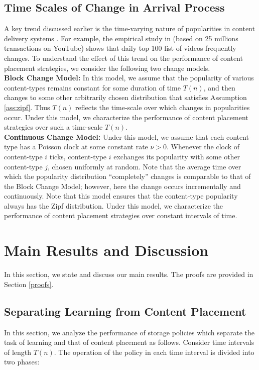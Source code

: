 \documentclass[10pt, conference, letterpaper]{IEEEtran}
\begin{document}
\subsection{Time Scales of Change in Arrival Process}
\label{subsec:change_model}
A key trend discussed earlier is the time-varying nature of
popularities in content delivery systems \cite{Gill07,temporal13}. For
example, the empirical study in \cite{Gill07} (based on 25 millions
transactions on YouTube) shows that daily top 100 list of videos
frequently changes.
To understand the effect of this trend on the performance of content
placement strategies, we consider the following two change models.\\

\noindent \textbf{Block Change Model:} In this model, we assume that
the popularity of various content-types remains constant for some
duration of time $T(n)$, and then changes to some other arbitrarily
chosen distribution that satisfies Assumption \ref{ass:zipf}. Thus
$T(n)$ reflects the time-scale over which changes in popularities
occur. Under this model, we characterize the performance of content
placement strategies over such a time-scale $T(n)$. \\

\noindent \textbf{Continuous Change Model:} Under this model, we
assume that each content-type has a Poisson clock at some constant
rate $\nu>0$. Whenever the clock of content-type $i$ ticks,
content-type $i$ exchanges its popularity with some other content-type
$j$, chosen uniformly at random. Note that the average time over which
the popularity distribution ``completely'' changes is comparable to
that of the Block Change Model; however, here the change occurs incrementally
and continuously. Note that this model ensures that the
content-type popularity always has the Zipf distribution.
Under this model, we characterize the performance of content placement
strategies over constant intervals of time.

\section{Main Results and Discussion}
\label{sec:main_results}

In this section, we state and discuss our main results. The
proofs are provided in Section \ref{proofs}.


\subsection{Separating Learning from Content Placement}
\label{subsec:LBSSP}
In this section, we analyze the performance of storage policies which
separate the task of learning and that of content placement as
follows. Consider time intervals of length $T(n)$. The operation of
the policy in each time interval is divided into two phases:\\
\end{document}
